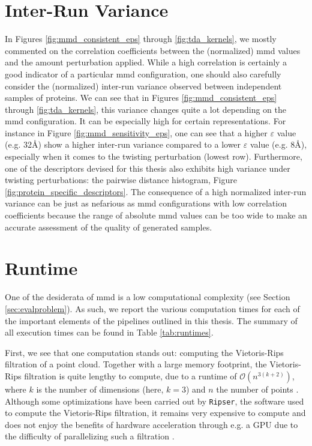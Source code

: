 \section{Inter-Run Variance}

In Figures \ref{fig:mmd_consistent_eps} through \ref{fig:tda_kernels}, we mostly
commented on the correlation coefficients between the (normalized) \acrshort{mmd} values
and the amount perturbation applied. While a high correlation is certainly a
good indicator of a particular \acrshort{mmd} configuration, one should also carefully
consider the (normalized) inter-run variance observed between independent
samples of proteins. We can see that in Figures \ref{fig:mmd_consistent_eps}
through \ref{fig:tda_kernels}, this variance changes quite a lot depending on
the \acrshort{mmd} configuration. It can be especially high for certain representations.
For instance in Figure \ref{fig:mmd_sensitivity_eps}, one can see that a higher
$\varepsilon$ value (e.g. 32\si{\angstrom}) show a higher inter-run variance
compared to a lower $\varepsilon$ value (e.g. 8\si{\angstrom}), especially when
it comes to the twisting perturbation (lowest row). Furthermore, one of the
descriptors devised for this thesis also exhibits high variance under twisting
perturbations: the pairwise distance histogram, Figure
\ref{fig:protein_specific_descriptors}. The consequence of a high normalized
inter-run variance can be just as nefarious as \acrshort{mmd} configurations with low
correlation coefficients because the range of absolute \acrshort{mmd} values can be too wide
to make an accurate assessment of the quality of generated samples.


\section{Runtime}\label{sec:results_runtime}

One of the desiderata of \acrshort{mmd} is a low computational complexity (see Section
\ref{sec:evalproblem}). As such, we report the various computation times for
each of the important elements of the pipelines outlined in this thesis. The
summary of all execution times can be found in Table \ref{tab:runtimes}.

First, we see that one computation stands out: computing the Vietoris-Rips
filtration of a point cloud. Together with a large memory footprint, the
Vietoris-Rips filtration is quite lengthy to compute, due to a runtime of
$\mathcal{O}(n^{3(k+2)})$, where $k$ is the number of dimensions (here, $k=3$)
and $n$ the number of points \citep{adams2018persistent}. Although some optimizations have been carried out
by \texttt{Ripser}, the software used to compute the Vietoris-Rips filtration,
it remains very expensive to compute and does not enjoy the benefits of hardware
acceleration through e.g. a GPU due to the difficulty of parallelizing such a
filtration \citep{Bauer2021Ripser}.

